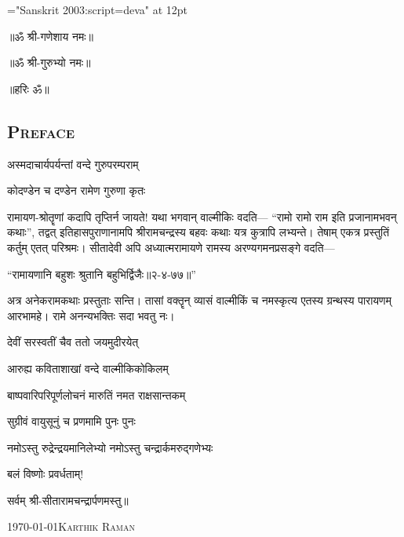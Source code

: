 {\font \x="Sanskrit 2003:script=deva" at 12pt\x
\centerline{॥ॐ श्री-गणेशाय नमः॥}
\centerline{॥ॐ श्री-गुरुभ्यो नमः॥}
\centerline{॥हरिः ॐ॥}
}
\thispagestyle{empty}

\begin{center}
\chapter*{\texorpdfstring{\scshape{Preface}}{Preface}}
\end{center}

{अस्मदाचार्यपर्यन्तां वन्दे गुरुपरम्पराम्}

{कोदण्डेन च दण्डेन रामेण गुरुणा कृतः}

रामायण-श्रोतॄणां कदापि तृप्तिर्न जायते! यथा भगवान् वाल्मीकिः वदति--- ``रामो रामो राम इति प्रजानामभवन् कथाः'', तद्वत् इतिहासपुराणानामपि श्रीरामचन्द्रस्य बहवः कथाः यत्र कुत्रापि लभ्यन्ते। तेषाम् एकत्र प्रस्तुतिं कर्तुम् एतत् परिश्रमः। सीतादेवी अपि अध्यात्मरामायणे रामस्य अरण्यगमनप्रसङ्गे वदति---

``रामायणानि बहुशः श्रुतानि बहुभिर्द्विजैः॥२-४-७७॥'' 

अत्र अनेकरामकथाः प्रस्तुताः सन्ति। तासां वक्तॄन् व्यासं वाल्मीकिं च नमस्कृत्य एतस्य ग्रन्थस्य पारायणम् आरभामहे। रामे अनन्यभक्तिः सदा भवतु नः। 

{देवीं सरस्वतीं चैव ततो जयमुदीरयेत्}

{आरुह्य कविताशाखां वन्दे वाल्मीकिकोकिलम्}


{बाष्पवारिपरिपूर्णलोचनं मारुतिं नमत राक्षसान्तकम्}

{सुग्रीवं वायुसूनुं च प्रणमामि पुनः पुनः}

{नमोऽस्तु रुद्रेन्द्रयमानिलेभ्यो नमोऽस्तु चन्द्रार्कमरुद्गणेभ्यः}


बलं विष्णोः प्रवर्धताम्!



\centerline{सर्वम् श्री-सीतारामचन्द्रार्पणमस्तु॥}

\medskip
\noindent\today \hfill \textsc{Karthik Raman}
